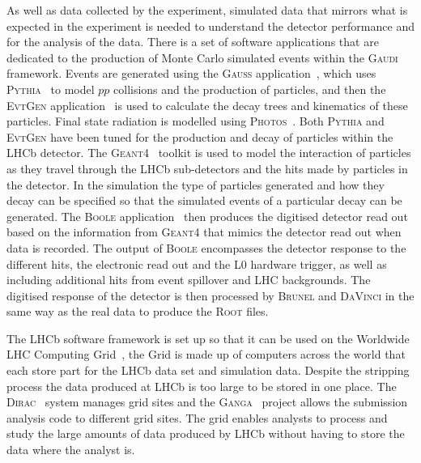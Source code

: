 As well as data collected by the experiment, simulated data that mirrors what is expected in the experiment is needed to understand the detector performance and for the analysis of the data. There is a set of software applications that are dedicated to the production of Monte Carlo simulated events within the \textsc{Gaudi} framework. Events are generated using the \textsc{Gauss} application~\cite{1742-6596-331-3-032047, Clemencic:2011zza}, which uses \textsc{Pythia}~\cite{Sjostrand:2006za,Sjostrand:2007gs} to model $pp$ collisions and the production of particles, and then the \textsc{Evt}\textsc{Gen} application~\cite{Lange:2001uf} is used to calculate the decay trees and kinematics of these particles. Final state radiation is modelled using \textsc{Photos}~\cite{Golonka:2005pn}. Both \textsc{Pythia} and \textsc{Evt}\textsc{Gen} have been tuned for the production and decay of particles within the LHCb detector. The \textsc{Geant4}~\cite{Agostinelli:2002hh,Allison:2006ve} toolkit is used to model the interaction of particles as they travel through the LHCb sub-detectors and the hits made by particles in the detector. In the simulation the type of particles generated and how they decay can be specified so that the simulated events of a particular decay can be generated. The \textsc{Boole} application~\cite{boole} then produces the digitised detector read out based on the information from \textsc{Geant4} that mimics the detector read out when data is recorded. The output of \textsc{Boole} encompasses the detector response to the different hits, the electronic read out and the L0 hardware trigger, as well as including additional hits from event spillover and LHC backgrounds. The digitised response of the detector is then processed by \textsc{Brunel} and \textsc{DaVinci} in the same way as the real data to produce the \textsc{Root} files. %

The LHCb software framework is set up so that it can be used on the Worldwide LHC Computing Grid~\cite{Bird:2011zz, WWCG}, the Grid is made up of computers across the world that each store part for the LHCb data set and simulation data. Despite the stripping process the data produced at LHCb is too large to be stored in one place. The \textsc{Dirac}~\cite{Paterson:1397926} system manages grid sites and the \textsc{Ganga}~\cite{Ganga, Ganga2} project allows the submission analysis code to different grid sites. The grid enables analysts to process and study the large amounts of data produced by LHCb without having to store the data where the analyst is. 





